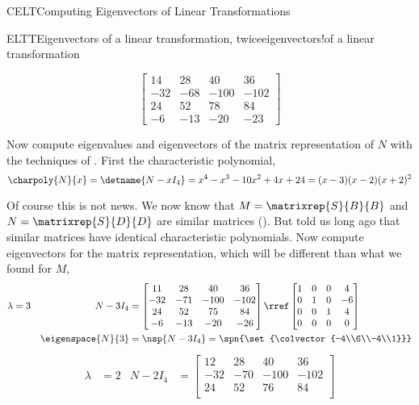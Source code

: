 \begin{subsect}{CELT}{Computing Eigenvectors of Linear Transformations}
\begin{example}{ELTT}{Eigenvectors of a linear transformation, twice}{eigenvectors!of a linear transformation}
\begin{para}
\begin{equation*}
\begin{bmatrix}
 14 & 28 & 40 & 36 \\
 -32 & -68 & -100 & -102 \\
 24 & 52 & 78 & 84 \\
 -6 & -13 & -20 & -23
\end{bmatrix}
\end{equation*}
\end{para}
%
\begin{para}Now compute eigenvalues and eigenvectors of the matrix representation of $N$ with the techniques of .  First the characteristic polynomial,
%
\begin{equation*}
\charpoly{N}{x}=\detname{N-xI_4}=x^4-x^3-10 x^2+4 x+24=(x-3) (x-2) (x+2)^2
\end{equation*}
\end{para}
%
\begin{para}Of course this is not news.  We now know that $M=\matrixrep{S}{B}{B}$ and $N=\matrixrep{S}{D}{D}$ are similar matrices ().  But  told us long ago that similar matrices have identical characteristic polynomials.  Now compute eigenvectors for the matrix representation,  which will be different than what we found for $M$,
%
\begin{align*}
\lambda&=3&N-3I_4&=
\begin{bmatrix}
 11 & 28 & 40 & 36 \\
 -32 & -71 & -100 & -102 \\
 24 & 52 & 75 & 84 \\
 -6 & -13 & -20 & -26
\end{bmatrix}
\rref
\begin{bmatrix}
 1 & 0 & 0 & 4 \\
 0 & 1 & 0 & -6 \\
 0 & 0 & 1 & 4 \\
 0 & 0 & 0 & 0
\end{bmatrix}\\
&&\eigenspace{N}{3}&=\nsp{N-3I_4}
=\spn{\set{\colvector{-4\\6\\-4\\1}}}
\end{align*}
%
\begin{align*}
\lambda&=2&N-2I_4&=
\begin{bmatrix}
 12 & 28 & 40 & 36 \\
 -32 & -70 & -100 & -102 \\
 24 & 52 & 76 & 84 \\

\end{bmatrix}
\end{align*}
\end{para}
\end{example}
\end{subsect}
